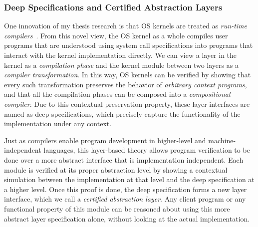 \documentclass[a4paper, 10pt]{article}
\begin{document}
\begin{small}
\subsubsection*{\small Deep Specifications and Certified Abstraction Layers}
\begin{comment}
Modern OS kernels are designed and constructed using a
stack of \emph{abstraction layers},
each of which defines an interface that hides the underlying implementation
details. Client programs can be understood solely based on the interface,
independent of the layer implementation. Despite their huge contributions
to the computer industry,
abstraction layers have mostly been treated as a system
concept; before our work, they have almost never been formally specified or verified.
\end{comment}
One innovation of my thesis research is that  OS kernels are treated as \emph{run-time compilers}~\cite{popl15-gu}.
From this novel view,
the OS kernel as a whole compiles
user programs that are understood using system call specifications  into programs that interact 
with the kernel implementation directly.
We can view a layer in the kernel as a \emph{compilation phase}
and the kernel module between two layers as a \emph{compiler transformation}.
In this way,  OS kernels can be verified by showing that
every such transformation
preserves the behavior of \emph{arbitrary context programs},
and that all the compilation phases can be composed into a \emph{compositional compiler}.
Due to this contextual preservation property,
these layer interfaces are named
as deep specifications, which precisely capture the functionality of the implementation under any context.


Just as compilers enable program development
in higher-level and machine-independent languages,
this layer-based theory allows program verification to be done
over a more abstract interface that is implementation independent. Each module is verified
at its proper abstraction level by showing a contextual
simulation between the implementation at that level
and the deep specification at a higher level.
Once this proof is done, the deep specification forms a new layer interface, which we call a \emph{certified abstraction layer}.
Any client program or any functional property of this module
can be reasoned about using this more abstract  layer specification alone, without looking at the actual implementation.


\end{small}
\end{document}
